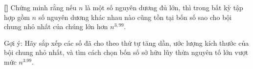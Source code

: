\documentclass[../01-divisibility.tex]{subfiles}
\begin{document}
\begin{exercise*}\label{example:HUN-2015-TST-KMA-633}\textbf{[]}
    Chứng minh rằng nếu \( n \) là một số nguyên dương đủ lớn,
    thì trong bất kỳ tập hợp gồm \( n \) số nguyên dương khác nhau nào cũng tồn tại bốn số sao cho bội chung nhỏ nhất của chúng lớn hơn \( n^{3{,}99} \).
\end{exercise*}

\begin{remark*}
    Gợi ý: Hãy sắp xếp các số đã cho theo thứ tự tăng dần, ước lượng kích thước của bội chung nhỏ nhất,
    và tìm cách chọn bốn số sở hữu lũy thừa nguyên tố lớn vượt mức \( n^{3.99} \).
\end{remark*}

\end{document}
